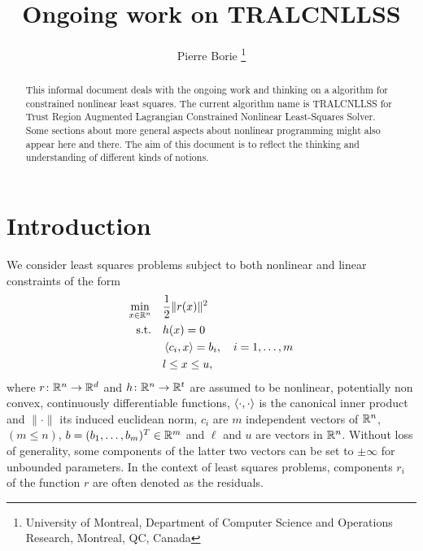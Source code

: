 \documentclass[10pt]{article}
\numberwithin{equation}{section}
\newcommand{\footremember}[2]{%
	\footnote{#2}
	\newcounter{#1}
	\setcounter{#1}{\value{footnote}}%
}
\begin{document}
	
	
	\title{Ongoing work on TRALCNLLSS} %
	\author{Pierre Borie\footremember{1}{University of Montreal, Department of Computer Science and Operations Research, Montreal, QC, Canada}}
	\date{}
	
	
	
	\maketitle
	\tableofcontents
	
	\begin{abstract}
		\noindent This informal document deals with the ongoing work and thinking on a algorithm for constrained nonlinear least squares. The current algorithm  name is TRALCNLLSS for Trust Region Augmented Lagrangian Constrained Nonlinear Least-Squares Solver. Some sections about more general aspects about nonlinear programming might also appear here and there. The aim of this document is to reflect the thinking and understanding of different kinds of notions. 
	\end{abstract} %
	

	\section{Introduction}\label{sec:intro}
	
	We consider least squares problems subject to both nonlinear and linear constraints of the form
	\begin{equation}
		\label{eq:model_cnls}
		\begin{aligned}
			\min_{x\in {\mathbb{R}}^n} \quad & \dfrac{1}{2} \|r(x)\|^2 \\
			\text{s.t.} \quad & h(x) = 0 \\
			& \left\langle {c_i} , {x} \right\rangle = b_i,\quad i=1,\ldots,m \\
			& l \le x \le u,
		\end{aligned}
	\end{equation}
	where $r\colon {\mathbb{R}}^n \to {\mathbb{R}}^d$  and $h\colon {\mathbb{R}}^n \to {\mathbb{R}}^t$ are assumed to be nonlinear, potentially non convex, continuously differentiable functions, $\left\langle {\cdot} , {\cdot} \right\rangle$ is the canonical inner product and $\|\cdot\| $  its induced euclidean norm, $c_i$ are $m$  independent vectors of ${\mathbb{R}}^n$, $( m \le n)$, $b=(b_1,\ldots,b_m)^T \in {\mathbb{R}}^m$ and $\ell$ and $u$ are vectors in ${\mathbb{R}}^n$. Without loss of generality, some components of the latter two vectors can be set to $\pm \infty$ for unbounded parameters. In the context of least squares problems, components $r_i$ of the function $r$ are often denoted as the residuals.
	
\end{document}
